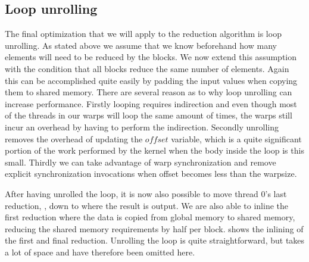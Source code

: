 \subsection{Loop unrolling}\label{sec:loopUnrolling}


The final optimization that we will apply to the reduction algorithm
is loop unrolling. As stated above we assume that we know beforehand
how many elements will need to be reduced by the blocks. We now extend
this assumption with the condition that all blocks reduce the same
number of elements. Again this can be accomplished quite easily by
padding the input values when copying them to shared memory. There are
several reason as to why loop unrolling can increase
performance. Firstly looping requires indirection and even though most
of the threads in our warps will loop the same amount of times, the
warps still incur an overhead by having to perform the
indirection. Secondly unrolling removes the overhead of updating the
$offset$ variable, which is a quite significant portion of the work
performed by the kernel when the body inside the loop is this
small. Thirdly we can take advantage of warp synchronization and
remove explicit synchronization invocations when offset becomes less
than the warpsize.


After having unrolled the loop, it is now also possible to move thread
0's last reduction, , down to where the
result is output. We are also able to inline the first reduction where
the data is copied from global memory to shared memory, reducing the
shared memory requirements by half per
block.  shows the inlining of the first and
final reduction. Unrolling the loop is quite straightforward, but
takes a lot of space and have therefore been omitted here.


